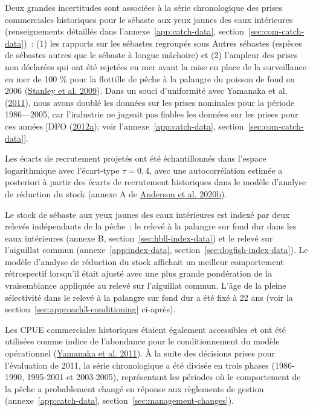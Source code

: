 \documentclass[french,11pt]{book}
\begin{document}
Deux grandes incertitudes sont associées à la série chronologique des prises commerciales historiques pour le sébaste aux yeux jaunes des eaux intérieures (renseignements détaillés dans l'annexe~\ref{app:catch-data}, section~\ref{sec:com-catch-data})~: (1) les rapports sur les sébastes regroupés sous Autres sébastes (espèces de sébastes autres que le sébaste à longue mâchoire) et (2) l'ampleur des prises non déclarées qui ont été rejetées en mer avant la mise en place de la surveillance en mer de 100 \% pour la flottille de pêche à la palangre du poisson de fond en 2006 (\protect\hyperlink{ref-stanley2009}{Stanley et al. 2009}). Dans un souci d'uniformité avec Yamanaka et al. (\protect\hyperlink{ref-yamanaka2011}{2011}), nous avons doublé les données sur les prises nominales pour la période 1986---2005, car l'industrie ne jugeait pas fiables les données sur les prises pour ces années {[}DFO (\protect\hyperlink{ref-dfo2012}{2012a}); voir l'annexe~\ref{app:catch-data}, section~\ref{sec:com-catch-data}{]}.

Les écarts de recrutement projetés ont été échantillonnés dans l'espace logarithmique avec l'écart-type \(\tau = 0,4\), avec une autocorrélation estimée a posteriori à partir des écarts de recrutement historiques dans le modèle d'analyse de réduction du stock (annexe A de \protect\hyperlink{ref-anderson2020gfmp}{Anderson et al. 2020b}).

Le stock de sébaste aux yeux jaunes des eaux intérieures est indexé par deux relevés indépendants de la pêche~: le relevé à la palangre sur fond dur dans les eaux intérieures (annexe B, section~\ref{sec:hbll-index-data}) et le relevé sur l'aiguillat commun (annexe~\ref{app:index-data}, section~\ref{sec:dogfish-index-data}). Le modèle d'analyse de réduction du stock affichait un meilleur comportement rétrospectif lorsqu'il était ajusté avec une plus grande pondération de la vraisemblance appliquée au relevé sur l'aiguillat commun. L'âge de la pleine sélectivité dans le relevé à la palangre sur fond dur a été fixé à 22 ans (voir la section~\ref{sec:approach3-conditioning} ci-après).

Les CPUE commerciales historiques étaient également accessibles et ont été utilisées comme indice de l'abondance pour le conditionnement du modèle opérationnel (\protect\hyperlink{ref-yamanaka2011}{Yamanaka et al. 2011}). À la suite des décisions prises pour l'évaluation de 2011, la série chronologique a été divisée en trois phases (1986-1990, 1995-2001 et 2003-2005), représentant les périodes où le comportement de la pêche a probablement changé en réponse aux règlements de gestion (annexe~\ref{app:catch-data}, section~\ref{sec:management-changes}).
\end{document}
